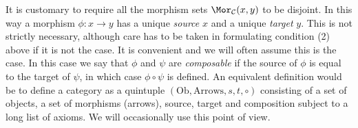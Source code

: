 \noindent
It is customary to require all the morphism sets
$\Mor_\mathcal{C}(x, y)$ to be disjoint.
In this way a morphism $\phi: x \to y$ has a unique {\it source} $x$
and a unique {\it target} $y$. This is not strictly necessary,
although care has to be taken in formulating condition (2) above
if it is not the case. It is convenient and we will often assume
this is the case. In this case we say that $\phi$ and $\psi$ are
{\it composable} if the source of $\phi$ is equal to the
target of $\psi$, in which case $\phi \circ \psi$ is defined.
An equivalent definition would be to define a category
as a quintuple $(\text{Ob}, \text{Arrows}, s, t, \circ)$
consisting of a set of objects, a set of morphisms (arrows),
source, target and composition subject to a long list of axioms.
We will occasionally use this point of view.

